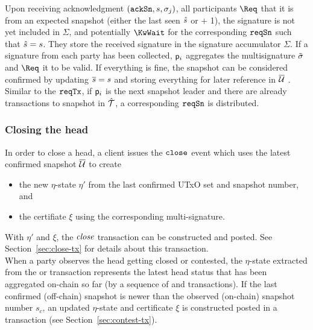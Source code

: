 \quad Upon receiving acknowledgment $(\mathtt{ackSn},s,\sigma_j)$,
all participants $\Req$ that it is from an expected snapshot (either the last
seen $\hat s$ or + 1), the signature is not yet included in $\Sigma$, and
potentially $\KwWait$ for the corresponding $\mathtt{reqSn}$ such that $\hat s = s$. They
store the received signature in the signature accumulator $\Sigma$. If a
signature from each party has been collected, $\mathsf p_i$ aggregates the
multisignature $\tilde\sigma$ and $\Req$ it to be valid.  If everything is fine, the snapshot can be considered confirmed
 by updating $\overline s=s$ and
storing everything for later reference in $\overline {\mathcal U}$ . Similar to the $\mathtt{reqTx}$, if $\mathsf p_i$ is the next snapshot leader and
there are already transactions to snapshot in $\hat {\mathcal T}$, a corresponding $\mathtt{reqSn}$
is distributed.

\subsubsection{Closing the head}

\quad In order to close a head, a client issues the
$\mathtt{close}$ event which uses the latest confirmed snapshot $\overline {\mathcal U}$ to create
\begin{itemize}
  \item the new $\eta$-state $\eta'$ from the last confirmed UTxO set and snapshot
        number, and
  \item the certifiate $\xi$ using the corresponding multi-signature.
\end{itemize}
With $\eta'$ and $\xi$, the $\textit{close}$ transaction can be constructed and
posted. See Section~\ref{sec:close-tx} for details about this transaction. \\

\quad When a party observes
the head getting closed or contested, the $\eta$-state extracted from the
\mtxClose{} or \mtxContest{} transaction represents the latest head status that
has been aggregated on-chain so far (by a sequence of \mtxClose{} and
\mtxContest{} transactions). If the last confirmed (off-chain) snapshot is newer
than the observed (on-chain) snapshot number $s_{c}$, an updated $\eta$-state
and certificate $\xi$ is constructed posted in a \mtxContest{} transaction (see
Section~\ref{sec:contest-tx}).



